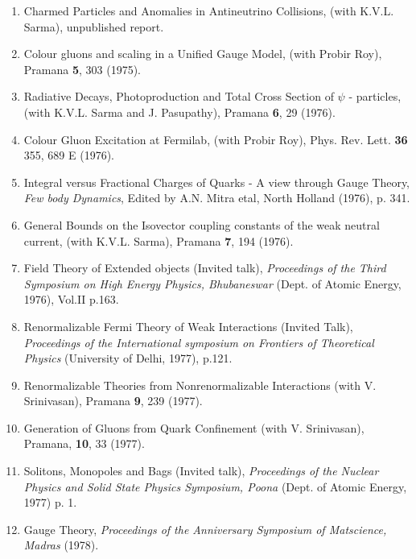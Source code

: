 \begin{enumerate}
\item Charmed Particles and Anomalies in Antineutrino Collisions, (with
K.V.L. Sarma), unpublished report. 

\item Colour gluons and scaling in a Unified Gauge Model, (with Probir
Roy), Pramana {\bf 5}, 303 (1975).

\item Radiative Decays, Photoproduction and Total Cross Section of
$\psi$ - particles, (with K.V.L. Sarma and J. Pasupathy), Pramana {\bf
6}, 29 (1976).

\item Colour Gluon Excitation at Fermilab, (with Probir Roy), Phys. Rev.
Lett. {\bf 36} 355, 689 E (1976).

\item Integral versus Fractional Charges of Quarks - A view through
Gauge Theory, {\em Few body Dynamics}, Edited by A.N. Mitra etal, North
Holland (1976), p. 341.

\item General Bounds on the Isovector coupling constants of the weak
neutral current, (with K.V.L. Sarma), Pramana {\bf 7}, 194 (1976).

\item Field Theory of Extended objects (Invited talk), {\it Proceedings of
the Third Symposium on High Energy Physics, Bhubaneswar} (Dept. of
Atomic Energy, 1976), Vol.II p.163.

\item Renormalizable Fermi Theory of Weak Interactions (Invited Talk),
{\it Proceedings of the International symposium on Frontiers of Theoretical
Physics} (University of Delhi, 1977), p.121.

\item Renormalizable Theories from Nonrenormalizable Interactions (with
V. Srinivasan), Pramana {\bf 9}, 239 (1977).

\item Generation of Gluons from Quark Confinement (with V. Srinivasan),
Pramana, {\bf 10}, 33 (1977).

\item Solitons, Monopoles and Bags (Invited talk), {\it Proceedings of the
Nuclear Physics and Solid State Physics Symposium, Poona} (Dept. of
Atomic Energy, 1977) p. 1.

\item Gauge Theory, {\it Proceedings of the Anniversary Symposium of
Matscience, Madras} (1978).


\end{enumerate}
